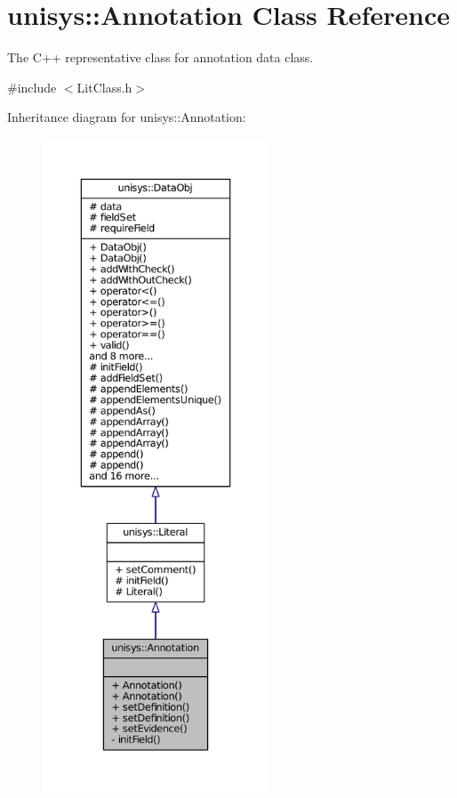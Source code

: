 \hypertarget{classunisys_1_1Annotation}{\section{unisys\-:\-:Annotation Class Reference}
\label{classunisys_1_1Annotation}
}


The C++ representative class for annotation data class.  




{\ttfamily \#include $<$Lit\-Class.\-h$>$}



Inheritance diagram for unisys\-:\-:Annotation\-:
\nopagebreak
\begin{figure}[H]
\begin{center}
\leavevmode
\includegraphics[height=550pt]{classunisys_1_1Annotation__inherit__graph}
\end{center}
\end{figure}


